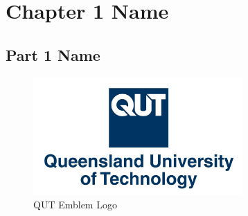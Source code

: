 \chapter{Chapter 1 Name}
\thispagestyle{empty}
\section{Part 1 Name}

\begin{figure}[h]
    \centering
    \includegraphics[width=8cm]{Images/QUT Emblem.jpg}
    \caption{QUT Emblem Logo}
    \label{fig:QUT Emblem}
\end{figure}